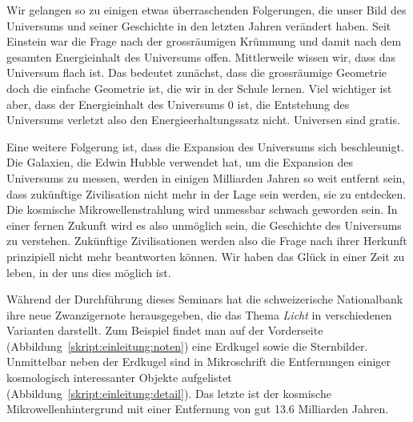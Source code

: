Wir gelangen so zu einigen etwas überraschenden Folgerungen, die
unser Bild des Universums und seiner Geschichte in den letzten Jahren
verändert haben.
Seit Einstein war die Frage nach der grossräumigen Krümmung
und damit nach dem gesamten Energieinhalt des Universums offen.
Mittlerweile wissen wir, dass das Universum flach ist.
Das bedeutet zunächst, dass die grossräumige Geometrie doch die
einfache Geometrie ist, die wir in der Schule lernen.
Viel wichtiger ist aber, dass der Energieinhalt des Universums $0$ ist,
die Entstehung des Universums verletzt also den Energieerhaltungssatz nicht.
Universen sind gratis.

Eine weitere Folgerung ist, dass die Expansion des Universums sich
beschleunigt.
Die Galaxien, die Edwin Hubble verwendet hat, um die Expansion des
Universums zu messen, werden in einigen Milliarden Jahren so
weit entfernt sein, dass zukünftige Zivilisation nicht mehr in der
Lage sein werden, sie zu entdecken.
Die kosmische Mikrowellenstrahlung wird unmessbar schwach geworden sein.
In einer fernen Zukunft wird es also unmöglich sein, die Geschichte
des Universums zu verstehen.
Zukünftige Zivilisationen werden also die Frage nach ihrer Herkunft
prinzipiell nicht mehr beantworten können.
Wir haben das Glück in einer Zeit zu leben, in der uns dies möglich ist.

Während der Durchführung dieses Seminars hat die schweizerische
Nationalbank ihre neue Zwanzigernote herausgegeben, die das Thema
{\em Licht} in verschiedenen Varianten darstellt.
Zum Beispiel findet man auf der Vorderseite
(Abbildung~\ref{skript:einleitung:noten})
eine Erdkugel sowie die Sternbilder. 
Unmittelbar neben der Erdkugel sind in Mikroschrift die Entfernungen
einiger kosmologisch interessanter Objekte aufgelistet
(Abbildung~\ref{skript:einleitung:detail}).
Das letzte ist der kosmische Mikrowellenhintergrund mit einer Entfernung
von gut 13.6 Milliarden Jahren.

